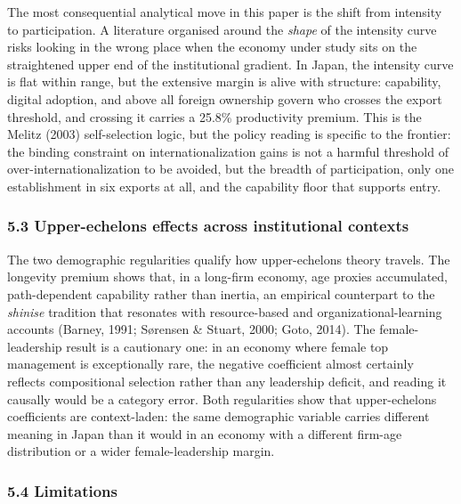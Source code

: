 \documentclass[
  12pt,a4paper]{article}
\begin{document}
The most consequential analytical move in this paper is the shift from
intensity to participation. A literature organised around the
\emph{shape} of the intensity curve risks looking in the wrong place
when the economy under study sits on the straightened upper end of the
institutional gradient. In Japan, the intensity curve is flat within
range, but the extensive margin is alive with structure: capability,
digital adoption, and above all foreign ownership govern who crosses the
export threshold, and crossing it carries a 25.8\% productivity premium.
This is the Melitz (2003) self-selection logic, but the policy reading
is specific to the frontier: the binding constraint on
internationalization gains is not a harmful threshold of
over-internationalization to be avoided, but the breadth of
participation, only one establishment in six exports at all, and the
capability floor that supports entry.

\hypertarget{upper-echelons-effects-across-institutional-contexts}{%
\subsubsection{5.3 Upper-echelons effects across institutional
contexts}\label{upper-echelons-effects-across-institutional-contexts}}

The two demographic regularities qualify how upper-echelons theory
travels. The longevity premium shows that, in a long-firm economy, age
proxies accumulated, path-dependent capability rather than inertia, an
empirical counterpart to the \emph{shinise} tradition that resonates
with resource-based and organizational-learning accounts (Barney, 1991;
Sørensen \& Stuart, 2000; Goto, 2014). The female-leadership result is a
cautionary one: in an economy where female top management is
exceptionally rare, the negative coefficient almost certainly reflects
compositional selection rather than any leadership deficit, and reading
it causally would be a category error. Both regularities show that
upper-echelons coefficients are context-laden: the same demographic
variable carries different meaning in Japan than it would in an economy
with a different firm-age distribution or a wider female-leadership
margin.

\hypertarget{limitations}{%
\subsubsection{5.4 Limitations}\label{limitations}}
\end{document}
